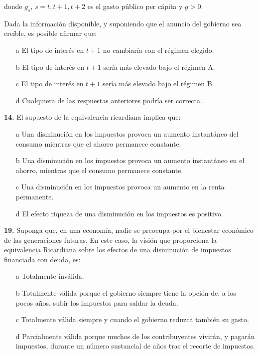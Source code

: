 \documentclass{nuevotema}
\begin{document}
donde $g_s$, $s=t, t+1, t+2$ es el gasto público per cápita y $g >0$.

Dada la información disponible, y suponiendo que el anuncio del gobierno sea creíble, es posible afirmar que:

\begin{itemize}
	\item[a] El tipo de interés en $t+1$ no cambiaría con el régimen elegido.
	\item[b] El tipo de interés en $t+1$ sería más elevado bajo el régimen A.
	\item[c] El tipo de interés en $t+1$ sería más elevado bajo el régimen B.
	\item[d] Cualquiera de las respuestas anteriores podría ser correcta.
\end{itemize}

\textbf{14.} El supuesto de la equivalencia ricardiana implica que:
\begin{itemize}
	\item[a] Una disminución en los impuestos provoca un aumento instantáneo del consumo mientras que el ahorro permanece constante.
	\item[b] Una disminución en los impuestos provoca un aumento instantáneo en el ahorro, mientras que el consumo permanece constante.
	\item[c] Una disminución en los impuestos provoca un aumento en la renta permanente.
	\item[d] El efecto riqueza de una disminución en los impuestos es positivo.
\end{itemize}

\textbf{19.} Suponga que, en una economía, nadie se preocupa por el bienestar económico de las generaciones futuras. En este caso, la visión que proporciona la equivalencia Ricardiana sobre los efectos de una disminución de impuestos financiada con deuda, es:

\begin{itemize}
	\item[a] Totalmente inválida.
	\item[b] Totalmente válida porque el gobierno siempre tiene la opción de, a los pocos años, subir los impuestos para saldar la deuda.
	\item[c] Totalmente válida siempre y cuando el gobierno reduzca también su gasto.
	\item[d] Parcialmente válida porque muchos de los contribuyentes vivirán, y pagarán impuestos, durante un número sustancial de años tras el recorte de impuestos.
\end{itemize}
\end{document}
